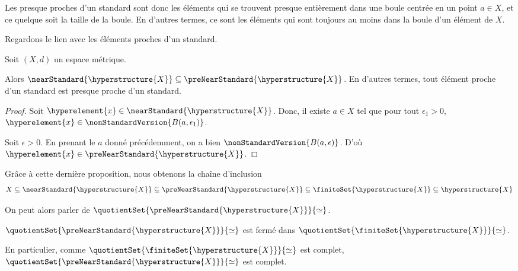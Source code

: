 Les presque proches d'un standard sont donc les éléments qui se trouvent presque
entièrement dans une boule centrée en un point $a \in X$, et ce quelque soit la
taille de la boule. En d'autres termes, ce sont les éléments qui sont toujours
au moins dans la boule d'un élément de $X$.

Regardons le lien avec les éléments proches d'un standard.

\begin{proposition}
	Soit $(X, d)$ un espace métrique.

	Alors $\nearStandard{\hyperstructure{X}} \subseteq
	\preNearStandard{\hyperstructure{X}}$.
	En d'autres termes, tout élément proche d'un standard est presque proche d'un
	standard.
\end{proposition}

\ifdefined\outputproof
\begin{proof}
	Soit $\hyperelement{x} \in \nearStandard{\hyperstructure{X}}$. Donc, il
	existe $a \in X$ tel que pour tout $\epsilon_{1} > 0$, $\hyperelement{x} \in
	\nonStandardVersion{B(a, \epsilon_{1})}$.

	Soit $\epsilon > 0$. En prenant le $a$ donné précédemment, on a bien
	$\nonStandardVersion{B(a, \epsilon)}$. D'où $\hyperelement{x} \in
	\preNearStandard{\hyperstructure{X}}$.
\end{proof}
\fi

Grâce à cette dernière proposition, nous obtenons la chaîne d'inclusion
\begin{equation}
	X \subseteq \nearStandard{\hyperstructure{X}} \subseteq
	\preNearStandard{\hyperstructure{X}} \subseteq
	\finiteSet{\hyperstructure{X}} \subseteq \hyperstructure{X}
\end{equation}

On peut alors parler de
$\quotientSet{\preNearStandard{\hyperstructure{X}}}{\simeq}$.

\begin{proposition}
	$\quotientSet{\preNearStandard{\hyperstructure{X}}}{\simeq}$ est fermé dans
	$\quotientSet{\finiteSet{\hyperstructure{X}}}{\simeq}$.

	En particulier, comme $\quotientSet{\finiteSet{\hyperstructure{X}}}{\simeq}$
	est complet, $\quotientSet{\preNearStandard{\hyperstructure{X}}}{\simeq}$ est
	complet.
\end{proposition}

